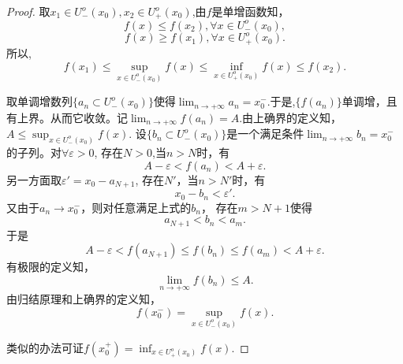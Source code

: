 \documentclass[utf8]{book}
\begin{document}
\begin{proof}
取$x_1\in U^o_-(x_0), x_2\in U^o_+(x_0)$,由$f$是单增函数知，
$$f(x) \leq f(x_2), \forall x\in U^o_-(x_0),$$ $$f(x)\geq f(x_1),\forall x\in U^o_+(x_0).$$
所以,$$f(x_1) \leq \displaystyle\sup_{x\in U^o_-(x_0)}f(x)\leq \displaystyle\inf_{x\in U^o_+(x_0)}f(x) \leq f(x_2).$$

取单调增数列$\{a_n\subset U^o_-(x_0)\}$使得$\displaystyle\lim_{n\to +\infty}a_n = x^-_0$.于是,$\{f(a_n)\}$单调增，且有上界。从而它收敛。记$\displaystyle\lim_{n\to +\infty}f(a_n) = A$.由上确界的定义知，$A \leq \displaystyle\sup_{x\in U^o_-(x_0)}f(x)$. 
设$\{b_n\subset U^o_-(x_0)\}$是一个满足条件$\displaystyle\lim_{n\to +\infty}b_n = x^-_0$的子列。对$\forall \varepsilon > 0$, 存在$N > 0$,当$n>N$时，有
$$A-\varepsilon < f(a_n) < A+\varepsilon.$$
另一方面取$\varepsilon'=x_0 - a_{N+1}$, 
存在$N'$，当$n>N'$时，有$$x_0-b_n < \varepsilon'.$$
又由于$a_n\to x^-_0$，则对任意满足上式的$b_n$， 存在$m > N+1$使得
$$a_{N+1} < b_n < a_m.$$
于是$$A - \varepsilon < f(a_{N+1}) \leq f(b_n) \leq f(a_m) < A + \varepsilon.$$
有极限的定义知，$$\displaystyle\lim_{n\to +\infty}f(b_n)\leq A.$$
由归结原理和上确界的定义知，$$f(x^-_0)=\displaystyle\sup_{x\in U^o_-(x_0)}f(x).$$

类似的办法可证$f(x^+_0)=\displaystyle\inf_{x\in U^o_+(x_0)}f(x)$.
\end{proof}
\end{document}
